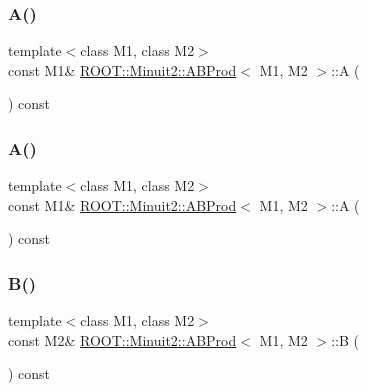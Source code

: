 \subsubsection{\texorpdfstring{A()}{A()}\hspace{0.1cm}{\footnotesize\ttfamily [1/2]}}
{\footnotesize\ttfamily template$<$class M1, class M2$>$ \\
const M1\& \mbox{\hyperlink{classROOT_1_1Minuit2_1_1ABProd}{R\+O\+O\+T\+::\+Minuit2\+::\+A\+B\+Prod}}$<$ M1, M2 $>$\+::A (\begin{DoxyParamCaption}{ }\end{DoxyParamCaption}) const\hspace{0.3cm}{\ttfamily [inline]}}

\mbox{\label{classROOT_1_1Minuit2_1_1ABProd_a14f6ecd4f0a72010d6c2a8e7f2916cfa}} 
\subsubsection{\texorpdfstring{A()}{A()}\hspace{0.1cm}{\footnotesize\ttfamily [2/2]}}
{\footnotesize\ttfamily template$<$class M1, class M2$>$ \\
const M1\& \mbox{\hyperlink{classROOT_1_1Minuit2_1_1ABProd}{R\+O\+O\+T\+::\+Minuit2\+::\+A\+B\+Prod}}$<$ M1, M2 $>$\+::A (\begin{DoxyParamCaption}{ }\end{DoxyParamCaption}) const\hspace{0.3cm}{\ttfamily [inline]}}

\mbox{\label{classROOT_1_1Minuit2_1_1ABProd_a526658028b2971b0dbf6f1b78b05d6a7}} 
\subsubsection{\texorpdfstring{B()}{B()}\hspace{0.1cm}{\footnotesize\ttfamily [1/2]}}
{\footnotesize\ttfamily template$<$class M1, class M2$>$ \\
const M2\& \mbox{\hyperlink{classROOT_1_1Minuit2_1_1ABProd}{R\+O\+O\+T\+::\+Minuit2\+::\+A\+B\+Prod}}$<$ M1, M2 $>$\+::B (\begin{DoxyParamCaption}{ }\end{DoxyParamCaption}) const\hspace{0.3cm}{\ttfamily [inline]}}

